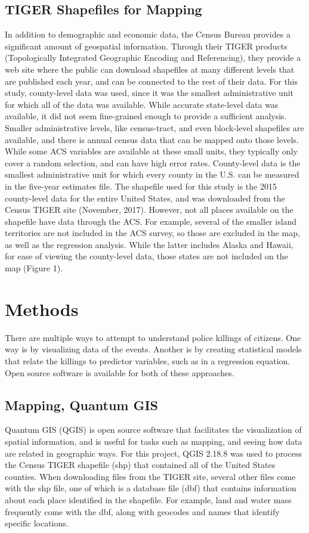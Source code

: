 \documentclass[sigconf]{acmart}
\begin{document}
\subsection{TIGER Shapefiles for Mapping}
In addition to demographic and economic data, the Census Bureau provides a significant amount of geospatial information.  Through their TIGER products (Topologically Integrated Geographic Encoding and Referencing), they provide a web site where the public can download shapefiles at many different levels that are published each year, and can be connected to the rest of their data. \cite{tiger} For this study, county-level data was used, since it was the smallest administrative unit for which all of the data was available.  While accurate state-level data was available, it did not seem fine-grained enough to provide a sufficient analysis.  Smaller administrative levels, like census-tract, and even block-level shapefiles are available, and there is annual census data that can be mapped onto those levels.  While  some ACS variables are available at these small units, they typically only cover a random selection, and can have high error rates.  County-level data is the smallest administrative unit for which every county in the U.S. can be measured in the five-year estimates file.  The shapefile used for this study is the 2015 county-level data for the entire United States, and was downloaded from the Census TIGER site (November, 2017). \cite{tiger}  However, not all places available on the shapefile have data through the ACS.  For example, several of the smaller island territories are not included in the ACS survey, so those are excluded in the map, as well as the regression analysis.  While the latter includes Alaska and Hawaii, for ease of viewing the county-level data, those states are not included on the map (Figure 1).


\section{Methods}

There are multiple ways to attempt to understand police killings of citizens.  One way is by visualizing data of the events.  Another is by creating statistical models that relate the killings to predictor variables, such as in a regression equation.  Open source software is available for both of these approaches.

\subsection{Mapping, Quantum GIS}
Quantum GIS (QGIS) is open source software that facilitates the visualization of spatial information, and is useful for tasks such as mapping, and seeing how data are related in geographic ways. \cite{qgis} For this project, QGIS 2.18.8 was used to process the Census TIGER shapefile (shp) that contained all of the United States counties.  When downloading files from the TIGER site, several other files come with the shp file, one of which is a database file (dbf) that contains information about each place identified in the shapefile.  For example, land and water mass frequently come with the dbf, along with geocodes and names that identify specific locations. 
\end{document}

